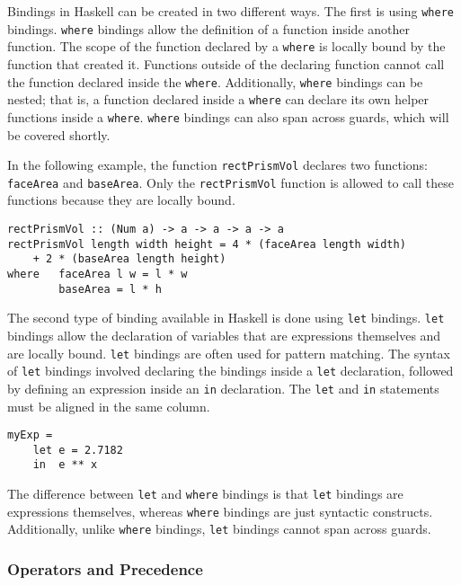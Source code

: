 \documentclass[titlepage,12pt]{article}
\begin{document}
Bindings in Haskell can be created in two different ways. The first is using \texttt{where} bindings. \texttt{where} bindings allow 
the definition of a function inside another function. The scope of the function declared by a \texttt{where} is locally bound 
by the function that created it. Functions outside of the declaring function cannot call the function declared inside 
the \texttt{where}. Additionally, \texttt{where} bindings can be nested; that is, a function declared inside a \texttt{where} can declare
its own helper functions inside a \texttt{where}. \texttt{where} bindings can also span across guards, which will be covered shortly. 

In the following example, the function \texttt{rectPrismVol} declares two functions: \texttt{faceArea} and \texttt{baseArea}. Only the 
\texttt{rectPrismVol} function is allowed to call these functions because they are locally bound. 

\begin{verbatim}
rectPrismVol :: (Num a) -> a -> a -> a -> a
rectPrismVol length width height = 4 * (faceArea length width)
    + 2 * (baseArea length height)
where   faceArea l w = l * w
        baseArea = l * h
\end{verbatim}

The second type of binding available in Haskell is done using \texttt{let} bindings. \texttt{let} bindings allow the declaration of 
variables that are expressions themselves and are locally bound.  \texttt{let} bindings are often used for pattern matching. 
The syntax of \texttt{let} bindings involved declaring the bindings inside a \texttt{let} declaration, followed by defining an 
expression inside an \texttt{in} declaration. The \texttt{let} and \texttt{in} statements must be aligned in the same column. 

\begin{verbatim}
myExp =
    let e = 2.7182
    in  e ** x
\end{verbatim}

The difference between \texttt{let} and \texttt{where} bindings is that \texttt{let} bindings are expressions themselves, whereas 
\texttt{where} bindings are just syntactic constructs. Additionally, unlike \texttt{where} bindings, \texttt{let} bindings cannot 
span across guards.

\subsubsection{Operators and Precedence}
\end{document}
